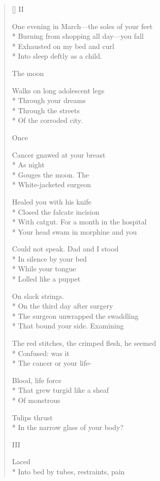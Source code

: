 \begin{verse}[\versewidth]
\hspace{0.45\versewidth}II

One evening in March---the soles of your feet\\*
Burning from shopping all day---you fall\\*
Exhausted on my bed and curl\\*
Into sleep deftly as a child.

 \qquad  \qquad  \qquad The moon

Walks on long adolescent legs\\*
Through your dreams\\*
Through the streets\\*
Of the corroded city.

 \qquad  \qquad  \qquad Once

Cancer gnawed at your breast\\*
As night\\*
Gouges the moon.  The \\*
White-jacketed surgeon

Healed you with his knife\\*
Closed the falcate incision\\*
With catgut.  For a month in the hospital\\*
Your head swam in morphine and you

Could not speak.  Dad and I stood\\*
In silence by your bed\\*
While your tongue \\*
Lolled like a puppet

On slack strings.\\*
On the third day after surgery\\*
The surgeon unwrapped the swaddling\\*
That bound your side. \qquad Examining

The red stitches, the crimped flesh, he seemed\\*
Confused: was it\\*
The cancer or your life-

Blood, life force\\*
That grew turgid \qquad like a sheaf\\*
Of monstrous

Tulips thrust\\*
In the narrow glass of your body?

\hspace{0.45\versewidth} III

 \qquad  \qquad Laced\\*
Into bed by tubes, restraints, pain


\end{verse}
